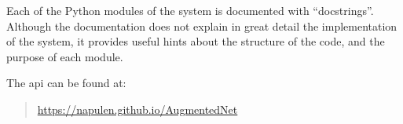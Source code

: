 
Each of the Python modules of the system is documented with
``docstrings''.
Although the documentation does not explain in great detail
the implementation of the system, it provides useful hints
about the structure of the code, and the purpose of each
module.

The \gls{api} can be found at:

\blockquote{\href{https://napulen.github.io/AugmentedNet}{https://napulen.github.io/AugmentedNet}}
